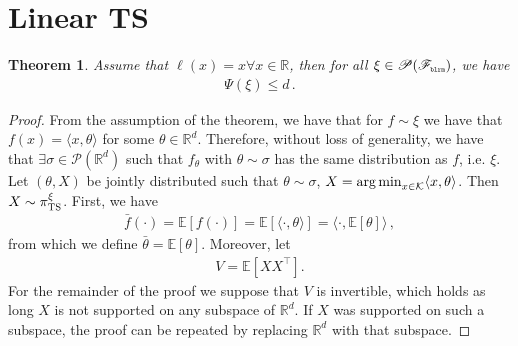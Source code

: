 \documentclass[letter, 12pt]{report}
\newcommand{\pr}{\text{\tiny\texttt{r}}}
\newcommand{\pb}{\text{\tiny\texttt{b}}}
\newcommand{\pl}{\text{\tiny\texttt{l}}}
\renewcommand{\pm}{\text{\tiny\texttt{m}}}
\newcommand{\R}{\mathbb R}
\newcommand{\argmin}{\operatornamewithlimits{arg\,min}}
\newcommand{\E}{\mathbb E}
\newcommand{\cK}{\mathcal K}
\newcommand{\sF}{\mathscr F}
\newcommand{\cP}{\mathcal P}
\newcommand{\sP}{\mathscr P}
\newcommand{\1}{\mathbf{1}}
\newcommand{\ts}{\textsc{TS}\xspace}
\theoremstyle{plain}
\newtheorem{theorem}{Theorem}
\theoremstyle{definition}
\theoremstyle{remark}
\begin{document}
\section{Linear \ts}
\begin{theorem}
    Assume that $\ell(x) = x \forall x \in \R$,
    then for all $\xi \in \sP(\sF_{\pb\pl\pr\pm})$, we have
    \begin{align*}
        \Psi(\xi) \leq d\,.
    \end{align*}
    \label{thm:ir-ts-linear}
\end{theorem}
\begin{proof}
    From the assumption of the theorem, we have that for $f\sim\xi$
    we have that $f(x) = \langle x, \theta \rangle$ for some $\theta \in \R^d$.
    Therefore, without loss of generality, we have that $\exists \sigma \in \cP(\R^d)$
    such that $f_\theta$ with $\theta \sim \sigma$ has the same distribution as $f$, i.e. $\xi$.
    Let $(\theta, X)$ be jointly distributed such that $\theta \sim \sigma$, $X = \argmin_{x \in \cK} \langle x, \theta\rangle$.
    Then $X \sim \pi_\ts^\xi$.
    First, we have
    \begin{align*}
        \bar f(\cdot) = \E[f(\cdot)] = \E[\langle \cdot, \theta \rangle] = \langle \cdot, \E[\theta]\rangle\,,
    \end{align*}
    from which we define $\bar{\theta} = \E[\theta]$.
    Moreover, let
    \begin{align*}
        V = \E[X X^\top].
    \end{align*}
    For the remainder of the proof we suppose that $V$ is invertible,
    which holds as long $X$ is not supported on any subspace of $\R^d$.
    If $X$ was supported on such a subspace, the proof can be repeated by replacing $\R^d$ with that subspace.


\end{proof}
\end{document}
